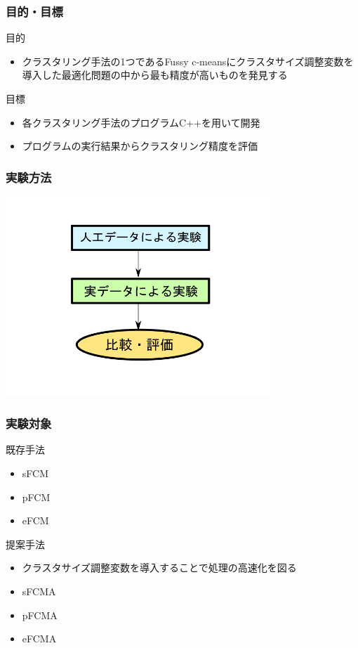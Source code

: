 \documentclass[13pt,dvipdfmx]{beamer}
\begin{document}
\begin{frame}\frametitle{目的・目標}
\begin{block}{目的}
\begin{itemize}
 \item クラスタリング手法の1つであるFussy c-meansにクラスタサイズ調整変数を導入した最適化問題の中から最も精度が高いものを発見する
\end{itemize}
\end{block}
\vspace{4mm}
\begin{block}{目標}
\begin{itemize}
 \item 各クラスタリング手法のプログラムC++を用いて開発
 \item プログラムの実行結果からクラスタリング精度を評価
\end{itemize}
\end{block}
\end{frame}

\begin{frame}\frametitle{実験方法}
\begin{center}
 \includegraphics[width=100mm]{experiment_process.png}
\end{center}
\end{frame}

\begin{frame}\frametitle{実験対象}
  \begin{block}{既存手法}
   \begin{itemize}
    \item sFCM
    \item pFCM
    \item eFCM
   \end{itemize}
  \end{block}

 \begin{block}{提案手法}
   \begin{itemize}
    \item クラスタサイズ調整変数を導入することで処理の高速化を図る
    \item sFCMA
    \item pFCMA
    \item eFCMA
   \end{itemize}
 \end{block}
\end{frame}
\end{document}
